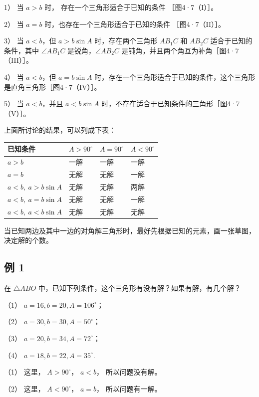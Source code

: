 1） 当 \(a > b\) 时， 存在一个三角形适合于已知的条件 ［图4·7（I）］。

2） 当 \(a = b\) 时，也存在一个三角形适合于已知的条件 ［图4·7（II）］。

3） 当 \(a < b\)，但 \(a > b \sin A\) 时，存在两个三角形 \(AB_{1}C\) 和
\(AB_{2}C\) 适合于已知的条件，其中 \(\angle AB_{1}C\)
是锐角，\(\angle AB_{2}C\) 是钝角，并且两个角互为补角［图4·7（III）］。

4） 当 \(a < b\)，但 \(a = b \sin A\)
时，存在一个三角形适合于已知的条件，这个三角形是直角三角形［图4·7（IV）］。

5） 当 \(a < b\)，并且 \(a < b \sin A\)
时，不存在适合于已知条件的三角形［图4·7（V）］。

上面所讨论的结果，可以列成下表：

{\def\LTcaptype{none} %
\begin{longtable}[]{@{}llll@{}}
\toprule\noalign{}
已知条件 & \(A>90^\circ\) & \(A=90^\circ\) & \(A<90^\circ\) \\
\midrule\noalign{}
\endhead
\bottomrule\noalign{}
\endlastfoot
\(a>b\) & 一解 & 一解 & 一解 \\
\(a=b\) & 无解 & 无解 & 一解 \\
\(a<b,\ a>b\sin A\) & 无解 & 无解 & 两解 \\
\(a<b,\ a=b\sin A\) & 无解 & 无解 & 一解 \\
\(a<b,\ a<b\sin A\) & 无解 & 无解 & 无解 \\
\end{longtable}
}

当已知两边及其中一边的对角解三角形时，最好先根据已知的元素，画一张草图，决定解的个数。

\subsection{例 1}

在 \(\triangle ABO\)
中，已知下列条件，这个三角形有没有解？如果有解，有几个解？

（1） \(a = 16, b = 20, A = 106^{\circ}\)；

（2） \(a = 30, b = 30, A = 50^{\circ}\)；

（3） \(a = 20, b = 34, A = 72^{\circ}\)；

（4） \(a = 18, b = 22, A = 35^{\circ}\).

 （1） 这里， \(A > 90^{\circ}\)， \(a < b\)，
所以问题没有解。

（2） 这里， \(A < 90^{\circ}\)， \(a = b\)， 所以问题有一解。

